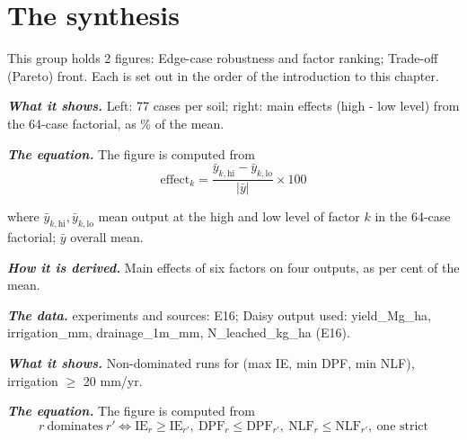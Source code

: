 \section{The synthesis}
This group holds 2 figures: Edge-case robustness and factor ranking; Trade-off (Pareto) front. Each is set out in the order of the introduction to this chapter.
\par\vspace{6pt}\noindent{}\par\nobreak
{}\label{fig:a20_30}
\par\noindent\textbf{\color{khmag}\emph{What it shows.}} Left: 77 cases per soil; right: main effects (high - low level) from the 64-case factorial, as \% of the mean.
\par\noindent\textbf{\color{khmag}\emph{The equation.}} The figure is computed from
\begin{equation}\boxed{\mathrm{effect}_k=\dfrac{\bar y_{k,\mathrm{hi}}-\bar y_{k,\mathrm{lo}}}{|\bar y|}\times100}\end{equation}
\par\noindent where $\bar y_{k,\mathrm{hi}},\bar y_{k,\mathrm{lo}}$ mean output at the high and low level of factor $k$ in the 64-case factorial; $\bar y$ overall mean.
\par\noindent\textbf{\color{khmag}\emph{How it is derived.}} Main effects of six factors on four outputs, as per cent of the mean.
\par\noindent\textbf{\color{khmag}\emph{The data.}} experiments and sources: E16; Daisy output used: yield\_Mg\_ha, irrigation\_mm, drainage\_1m\_mm, N\_leached\_kg\_ha (E16).
\par\vspace{6pt}\noindent{}\par\nobreak
{}\label{fig:a20_31}
\par\noindent\textbf{\color{khmag}\emph{What it shows.}} Non-dominated runs for (max IE, min DPF, min NLF), irrigation $\geq$ 20 mm/yr.
\par\noindent\textbf{\color{khmag}\emph{The equation.}} The figure is computed from
\begin{equation}\boxed{r\ \text{dominates}\ r' \iff \mathrm{IE}_r\ge\mathrm{IE}_{r'},\ \mathrm{DPF}_r\le\mathrm{DPF}_{r'},\ \mathrm{NLF}_r\le\mathrm{NLF}_{r'},\ \text{one strict}}\end{equation}
